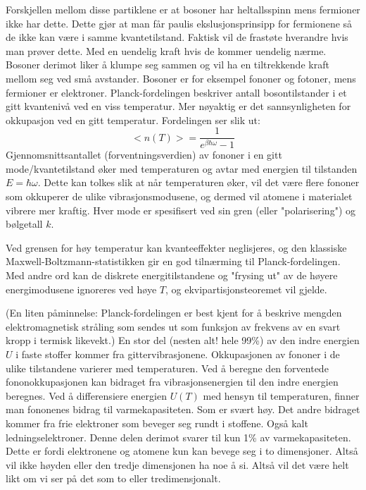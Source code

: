 \documentclass{article}
\begin{document}
Forskjellen mellom disse partiklene er at bosoner har heltallsspinn mens fermioner ikke har dette. Dette gjør at man får paulis ekslusjonsprinsipp for fermionene så de ikke kan være i samme kvantetilstand. Faktisk vil de frastøte hverandre hvis man prøver dette. Med en uendelig kraft hvis de kommer uendelig nærme. Bosoner derimot liker å klumpe seg sammen og vil ha en tiltrekkende kraft mellom seg ved små avstander. Bosoner er for eksempel fononer og fotoner, mens fermioner er elektroner.
Planck-fordelingen beskriver antall bosontilstander i et gitt kvantenivå ved en viss temperatur. Mer nøyaktig er det sannsynligheten for okkupasjon ved en gitt temperatur. Fordelingen ser slik ut:
\begin{equation}
    <n(T)> = \frac{1}{e^{\beta \hbar \omega}-1}
\end{equation}
Gjennomsnittsantallet (forventningsverdien) av fononer i en gitt mode/kvantetilstand øker med temperaturen og avtar med energien til tilstanden $ E = \hbar \omega $. Dette kan tolkes slik at når temperaturen øker, vil det være flere fononer som okkuperer de ulike vibrasjonsmodusene, og dermed vil atomene i materialet vibrere mer kraftig. Hver mode er spesifisert ved sin gren (eller "polarisering") og bølgetall $k$.

Ved grensen for høy temperatur kan kvanteeffekter neglisjeres, og den klassiske Maxwell-Boltzmann-statistikken gir en god tilnærming til Planck-fordelingen. Med andre ord kan de diskrete energitilstandene og "frysing ut" av de høyere energimodusene ignoreres ved høye $T$, og ekvipartisjonsteoremet vil gjelde.

(En liten påminnelse: Planck-fordelingen er best kjent for å beskrive mengden elektromagnetisk stråling som sendes ut som funksjon av frekvens av en svart kropp i termisk likevekt.)
En stor del (nesten alt! hele 99\%) av den indre energien $U$ i faste stoffer kommer fra gittervibrasjonene. Okkupasjonen av fononer i de ulike tilstandene varierer med temperaturen. Ved å beregne den forventede fononokkupasjonen kan bidraget fra vibrasjonsenergien til den indre energien beregnes. Ved å differensiere energien $U(T)$ med hensyn til temperaturen, finner man fononenes bidrag til varmekapasiteten. Som er svært høy. Det andre bidraget kommer fra frie elektroner som  beveger seg rundt i stoffene. Også kalt ledningselektroner. Denne delen derimot svarer til kun 1\% av varmekapasiteten.
Dette er fordi elektronene og atomene kun kan bevege seg i to dimensjoner. Altså vil ikke høyden eller den tredje dimensjonen ha noe å si. Altså vil det være helt likt om vi ser på det som to eller tredimensjonalt.
\end{document}
